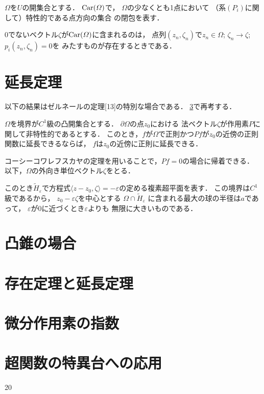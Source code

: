 \begin{DFN}
    \(\varOmega\)を\(U\)の開集合とする．
    \(\operatorname{Car}(\varOmega)\)で，
    \(\varOmega\)の少なくとも1点において
    （系\((P_i)\)に関して）特性的である点方向の集合
    の閉包を表す．
\end{DFN}

\(0\)でないベクトル\(\zeta\)が\(\operatorname{Car}(\varOmega)\)に含まれるのは，
点列\((z_{n},\zeta_{n})\)で\(z_{n}\in\varOmega\); %
\(\zeta_{n}\to\zeta\); \(p_{i}(z_{n},\zeta_{n})=0\)を
みたすものが存在するときである．



\section[延長定理]{延長定理}\label{sec:2}

以下の結果はゼルネールの定理[13]の特別な場合である．
\ref{sec:4}で再考する．

\begin{LMM}
    \(\varOmega\)を境界が\(C^1\)級の凸開集合とする．
    \(\partial\varOmega\)の点\(z_0\)における
    法ベクトル\(\zeta\)が作用素\(P\)に関して非特性的であるとする．
    このとき，\(f\)が\(\varOmega\)で正則かつ\(Pf\)が\(z_0\)の近傍の正則関数に延長できるならば，
    \(f\)は\(z_0\)の近傍に正則に延長できる．
\end{LMM}
コーシーコワレフスカヤの定理を用いることで，\(Pf=0\)の場合に帰着できる．
以下，\(\varOmega\)の外向き単位ベクトル\(\zeta\)をとる．

このとき\(\widetilde{H}_{\varepsilon}\)で方程式\(
    \langle z-z_0,\zeta\rangle=-\varepsilon
\)の定める複素超平面を表す．
この境界は\(C^1\)級であるから，
\(z_0-\varepsilon\zeta\)を中心とする
\(\varOmega\cap \widetilde{H}_{\varepsilon}\)
に含まれる最大の球の半径は\(a\)であって，
\(\varepsilon\)が\(0\)に近づくとき\(\varepsilon\)よりも
無限に大きいものである．
\section[凸錐の場合]{凸錐の場合}\label{sec:3}

\section[存在・延長定理]{存在定理と延長定理}\label{sec:4}

\section[微分作用素の指数]{微分作用素の指数}\label{sec:5}
\section[特異台への応用]{超関数の特異台への応用}\label{sec:6}



\begin{thebibliography}{20} 
\end{thebibliography}






